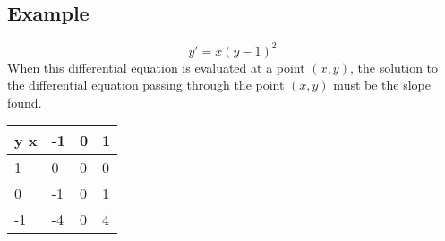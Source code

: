 \documentclass{article}
\theoremstyle{mytheoremstyle}
\theoremstyle{mytheoremstyle}
\theoremstyle{myproblemstyle}
\begin{document}
    \subsection*{Example}
    \[
        y'=x(y-1)^2
    \]
    When this differential equation is evaluated at a point $(x,y)$, the
    solution to the differential equation passing through the point $(x,y)$ must
    be the slope found.
    \begin{center}
        \begin{tabular}[c]{l|l l l}
            y x& -1 & 0 & 1 \\
            \hline
            1  & 0 & 0 & 0 \\
            0  & -1 & 0 & 1 \\
            -1 & -4 & 0 & 4 \\
        \end{tabular}
    \end{center}
\end{document}
